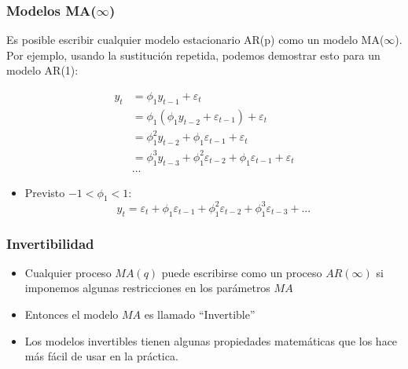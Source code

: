 \documentclass[10pt]{beamer}
\begin{document}
\begin{frame}[fragile]
\frametitle{Modelos MA($\infty$)}


Es posible escribir cualquier modelo estacionario AR(p) como un modelo MA($\infty$). Por ejemplo, usando la sustitución repetida, podemos demostrar esto para un modelo AR(1):


\begin{align*}
y_t &= \phi_1y_{t-1} + \varepsilon_t\\
&= \phi_1(\phi_1y_{t-2} + \varepsilon_{t-1}) + \varepsilon_t\\
&= \phi_1^2y_{t-2} + \phi_1 \varepsilon_{t-1} + \varepsilon_t\\
&= \phi_1^3y_{t-3} + \phi_1^2\varepsilon_{t-2} + \phi_1 \varepsilon_{t-1} + \varepsilon_t\\
& ...
\end{align*}

\begin{itemize}
\item Previsto $-1 < \phi_1 < 1$:\\
\begin{equation}
y_t = \varepsilon_t + \phi_1 \varepsilon_{t-1} + \phi_1^2 \varepsilon_{t-2} + \phi_1^3 \varepsilon_{t-3} + ...
\end{equation}

\end{itemize}

\end{frame}





\begin{frame}[fragile]
\frametitle{Invertibilidad}


\begin{itemize}
\item Cualquier proceso $MA(q)$ puede escribirse como un proceso $AR(\infty)$ si imponemos algunas restricciones en los parámetros $MA$

\item Entonces el modelo $MA$ es llamado ``Invertible''

\item Los modelos invertibles tienen algunas propiedades matemáticas que los hace más fácil de usar en la práctica.

\end{itemize}

\end{frame}
\end{document}
